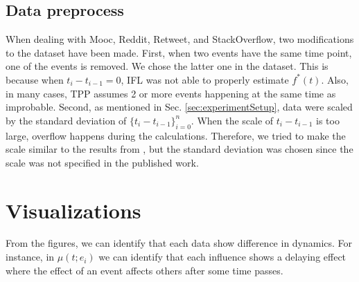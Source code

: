 \subsection{Data preprocess}
When dealing with Mooc, Reddit, Retweet, and StackOverflow, two modifications to the dataset have been made.
First, when two events have the same time point, one of the events is removed.
We chose the latter one in the dataset.
This is because when $t_i - t_{i-1} = 0$, IFL was not able to properly estimate $f^*(t)$.
Also, in many cases, TPP assumes 2 or more events happening at the same time as improbable.
Second, as mentioned in Sec. \ref{sec:experimentSetup}, data were scaled by the standard deviation of $\{t_{i} - t_{i-1}\}_{i=0} ^n$.
When the scale of $t_i - t_{i-1}$ is too large, overflow happens during the calculations.
Therefore, we tried to make the scale similar to the results from \cite{bib:MetaTPP}, but the standard deviation was chosen since the scale was not specified in the published work.


\section{Visualizations}

From the figures, we can identify that each data show difference in dynamics. 
For instance, in $\mu(t;e_i)$ we can identify that each influence shows a delaying effect where the effect of an event affects others after some time passes.



